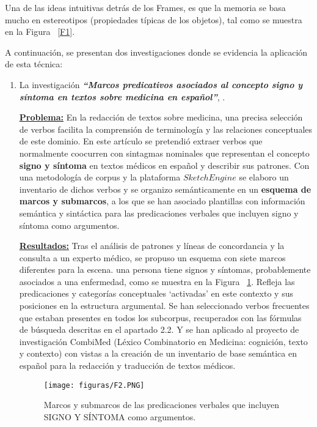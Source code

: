 \documentclass[10pt,conference]{IEEEtran}
\begin{document}
Una de las ideas intuitivas detrás de los Frames, es que la memoria se basa mucho en estereotipos (propiedades típicas de los objetos), tal como se muestra en la Figura ~\ref{F1}.

A continuación, se presentan dos investigaciones donde se evidencia la aplicación de esta técnica:
\begin{enumerate}
\item La investigación \textit{\textbf{“Marcos predicativos asociados al concepto signo y síntoma en textos sobre medicina en español”}}, \citep{lopez2020marcos}.

\textbf{\underline{Problema:}} En la redacción de textos sobre medicina, una precisa selección de verbos facilita la comprensión de terminología y las relaciones conceptuales de este dominio. En este artículo se pretendió extraer verbos que normalmente coocurren con sintagmas nominales que representan el concepto \textbf{signo y síntoma} en textos médicos en español y describir sus patrones. Con una metodología de corpus y la plataforma $Sketch Engine$ se elaboro un inventario de dichos verbos y se organizo semánticamente en un \textbf{esquema de marcos y submarcos}, a los que se han asociado plantillas con información semántica y sintáctica para las predicaciones verbales que incluyen signo y síntoma como argumentos.

\textbf{\underline{Resultados:}} Tras el análisis de patrones y líneas de concordancia y la consulta a un experto médico, se propuso un esquema con siete marcos diferentes para la escena. una persona tiene signos y síntomas, probablemente asociados a una enfermedad, como se muestra en la Figura ~\ref{F2}. Refleja las predicaciones y categorías conceptuales ‘activadas’ en este contexto y sus posiciones en la estructura argumental. Se han seleccionado verbos frecuentes que estaban presentes en todos los subcorpus, recuperados con las fórmulas de búsqueda descritas en el apartado 2.2. Y se han aplicado al proyecto de investigación CombiMed (Léxico Combinatorio en Medicina: cognición, texto y contexto) con vistas a la creación de un inventario de base semántica en español para la redacción y traducción de textos médicos. 

\begin{figure}[H]
\begin{center}
\texttt{[image: figuras/F2.PNG]}
\caption{Marcos y submarcos de las predicaciones verbales que incluyen SIGNO Y SÍNTOMA como argumentos.}
\label{F2} 
\end{center}
\end{figure}


\end{enumerate}
\end{document}
